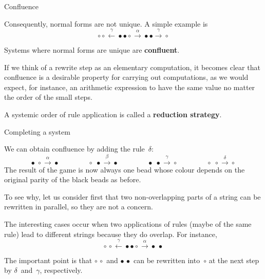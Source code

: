%
\begin{frame}{Confluence}

  Consequently, normal forms are not unique. A simple example is
  \begin{equation*}
    \circ \circ \xleftarrow{\gamma} \bullet \bullet \circ
    \xrightarrow{\alpha} \bullet \bullet \xrightarrow{\gamma}
    \circ
  \end{equation*}

  \medskip

  Systems where normal forms are unique are \textbf{confluent}.

  \bigskip

  If we think of a rewrite step as an elementary computation, it
  becomes clear that confluence is a desirable property for carrying
  out computations, as we would expect, for instance, an arithmetic
  expression to have the same value no matter the order of the small
  steps.

  \bigskip

  A systemic order of rule application is called a \textbf{reduction
    strategy}.

\end{frame}

%
\begin{frame}{Completing a system}

  We can obtain confluence by adding the rule~\(\delta\):
  \begin{equation*}
    \bullet \; \circ   \xrightarrow{\alpha} \bullet\qquad\qquad
    \circ   \; \bullet \xrightarrow{\beta} \bullet\qquad\qquad
    \bullet \; \bullet \xrightarrow{\gamma}
    \circ\qquad\qquad
    \circ\; \circ \xrightarrow{\delta} \circ
  \end{equation*}
  The result of the game is now always one bead whose colour depends
  on the original parity of the black beads as before.

  \bigskip

  To see why, let us consider first that two non\hyp{}overlapping
  parts of a string can be rewritten in parallel, so they are not a
  concern.

  \bigskip

  The interesting cases occur when two applications of rules (maybe of
  the same rule) lead to different strings because they do
  overlap. For instance,
  \begin{equation*}
    \circ \, \circ \xleftarrow{\gamma} \bullet \bullet
    \circ \xrightarrow{\alpha} \bullet \, \bullet
  \end{equation*}

  \medskip

  The important point is that \(\circ \, \circ\) and \(\bullet \,
  \bullet\) can be rewritten into~\(\circ\) at the next step by
  \(\delta\)~and~\(\gamma\), respectively.

\end{frame}

